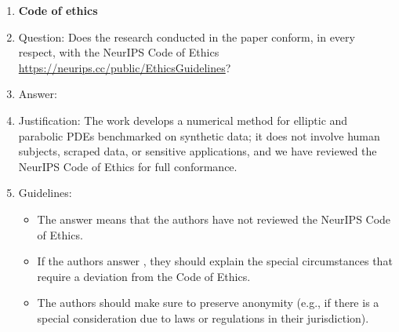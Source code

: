 \begin{enumerate}
\item {\bf Code of ethics}
    \item[] Question: Does the research conducted in the paper conform, in every respect, with the NeurIPS Code of Ethics \url{https://neurips.cc/public/EthicsGuidelines}?
    \item[] Answer: \answerYes{}
    \item[] Justification: The work develops a numerical method for elliptic and parabolic PDEs benchmarked on synthetic data; it does not involve human subjects, scraped data, or sensitive applications, and we have reviewed the NeurIPS Code of Ethics for full conformance.
    \item[] Guidelines:
    \begin{itemize}
        \item The answer \answerNA{} means that the authors have not reviewed the NeurIPS Code of Ethics.
        \item If the authors answer \answerNo, they should explain the special circumstances that require a deviation from the Code of Ethics.
        \item The authors should make sure to preserve anonymity (e.g., if there is a special consideration due to laws or regulations in their jurisdiction).
    \end{itemize}



\end{enumerate}
